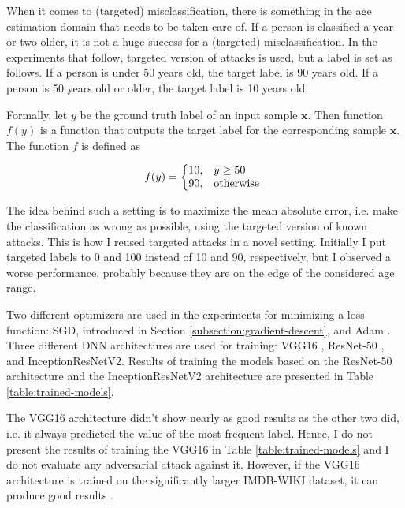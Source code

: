 When it comes to (targeted) misclassification, there is something in the age estimation domain that needs to be taken care of. If a person is classified a year or two older, it is not a huge success for a (targeted) misclassification. In the experiments that follow, targeted version of attacks is used, but a label is set as follows. If a person is under 50 years old, the target label is 90 years old. If a person is 50 years old or older, the target label is 10 years old. 

Formally, let $y$ be the ground truth label of an input sample $\pmb x$. Then function $f(y)$ is a function that outputs the target label for the corresponding sample $\pmb x$. The function $f$ is defined as

\begin{equation}
  f(y)=\left\{
  \begin{array}{@{}ll@{}}
       10, & y \geq 50 \\
   	  90, & \text{otherwise }
  \end{array}\right.
\end{equation} 

The idea behind such a setting is to maximize the mean absolute error, i.e. make the classification as wrong as possible, using the targeted version of known attacks.  This is how I reused targeted attacks in a novel setting. Initially I put targeted labels to 0 and 100 instead of 10 and 90, respectively, but I observed a worse performance, probably because they are on the edge of the considered age range.

Two different optimizers are used in the experiments for minimizing a loss function: SGD, introduced in Section \ref{subsection:gradient-descent}, and Adam \cite{DBLP:journals/corr/KingmaB14}. Three different DNN architectures are used for training: VGG16 \cite{DBLP:journals/corr/SimonyanZ14a}, ResNet-50 \cite{DBLP:journals/corr/HeZRS15}, and InceptionResNetV2\cite{DBLP:journals/corr/SzegedyIV16}. Results of training the models based on the ResNet-50 architecture and the InceptionResNetV2 architecture are presented in Table \ref{table:trained-models}. 

The VGG16 architecture didn't show nearly as good results as the other two did, i.e. it always predicted the value of the most frequent label. Hence, I do not present the results of training the VGG16 in Table \ref{table:trained-models} and I do not evaluate any adversarial attack against it. However, if the VGG16 architecture is trained on the significantly larger IMDB-WIKI dataset, it can produce good results \cite{Rothe-IJCV-2016}. 

